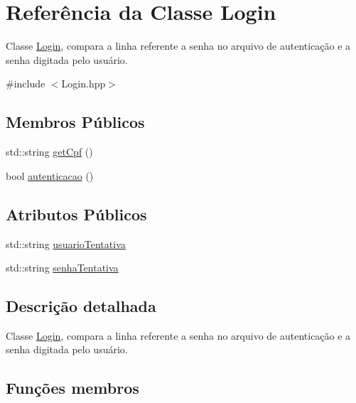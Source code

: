\hypertarget{class_login}{}\section{Referência da Classe Login}
\label{class_login}


Classe \mbox{\hyperlink{class_login}{Login}}, compara a linha referente a senha no arquivo de autenticação e a senha digitada pelo usuário.  




{\ttfamily \#include $<$Login.\+hpp$>$}

\subsection*{Membros Públicos}
\begin{DoxyCompactItemize}
\item 
std\+::string \mbox{\hyperlink{class_login_a11eac0940c4da0dd18e7d5ae5399046b}{get\+Cpf}} ()
\item 
bool \mbox{\hyperlink{class_login_a5387a5c79ce5cd17e7d3fd85fb12b83a}{autenticacao}} ()
\end{DoxyCompactItemize}
\subsection*{Atributos Públicos}
\begin{DoxyCompactItemize}
\item 
std\+::string \mbox{\hyperlink{class_login_ac137611f79410d16529d333fe503c8ec}{usuario\+Tentativa}}
\item 
std\+::string \mbox{\hyperlink{class_login_aa6bfcf95af6481918200dc7734137b49}{senha\+Tentativa}}
\end{DoxyCompactItemize}


\subsection{Descrição detalhada}
Classe \mbox{\hyperlink{class_login}{Login}}, compara a linha referente a senha no arquivo de autenticação e a senha digitada pelo usuário. 

\subsection{Funções membros}
\mbox{\label{class_login_a5387a5c79ce5cd17e7d3fd85fb12b83a}} 
